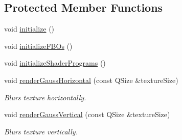 \subsection*{Protected Member Functions}
\begin{DoxyCompactItemize}
\item 
void \hyperlink{class_blur_effect_a735fa8b4020353e440d226e3a48a9e46}{initialize} ()
\item 
void \hyperlink{class_blur_effect_a673b5ec9a6f4a32bc0bab462b32c7200}{initialize\+F\+B\+Os} ()
\item 
void \hyperlink{class_blur_effect_a3acf8584853e2a2befdbb69eeb65aa2a}{initialize\+Shader\+Programs} ()
\item 
void \hyperlink{class_blur_effect_ad25107035e2585492d3501d8d2d51aa2}{render\+Gauss\+Horizontal} (const Q\+Size \&texture\+Size)
\begin{DoxyCompactList}\small\item\em Blurs texture horizontally. \end{DoxyCompactList}\item 
void \hyperlink{class_blur_effect_aaaaec0e2eb4530834e7ab3ad8beec231}{render\+Gauss\+Vertical} (const Q\+Size \&texture\+Size)
\begin{DoxyCompactList}\small\item\em Blurs texture vertically. \end{DoxyCompactList}\end{DoxyCompactItemize}
